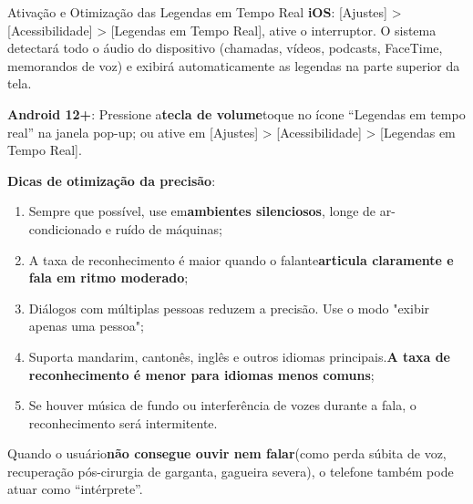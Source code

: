 \begin{tcbinfo}{Ativação e Otimização das Legendas em Tempo Real}
\textbf{iOS}: [Ajustes] > [Acessibilidade] > [Legendas em Tempo Real], ative o interruptor. O sistema detectará todo o áudio do dispositivo (chamadas, vídeos, podcasts, FaceTime, memorandos de voz) e exibirá automaticamente as legendas na parte superior da tela.

\textbf{Android 12+}: Pressione a\textbf{tecla de volume}toque no ícone “Legendas em tempo real” na janela pop-up; ou ative em [Ajustes] > [Acessibilidade] > [Legendas em Tempo Real].

\textbf{Dicas de otimização da precisão}:

\begin{enumerate}
  \item Sempre que possível, use em\textbf{ambientes silenciosos}, longe de ar-condicionado e ruído de máquinas;
  \item A taxa de reconhecimento é maior quando o falante\textbf{articula claramente e fala em ritmo moderado};
  \item Diálogos com múltiplas pessoas reduzem a precisão. Use o modo "exibir apenas uma pessoa";
  \item Suporta mandarim, cantonês, inglês e outros idiomas principais.\textbf{A taxa de reconhecimento é menor para idiomas menos comuns};
  \item Se houver música de fundo ou interferência de vozes durante a fala, o reconhecimento será intermitente.
\end{enumerate}

\end{tcbinfo}


Quando o usuário\textbf{não consegue ouvir nem falar}(como perda súbita de voz, recuperação pós-cirurgia de garganta, gagueira severa), o telefone também pode atuar como “intérprete”.

